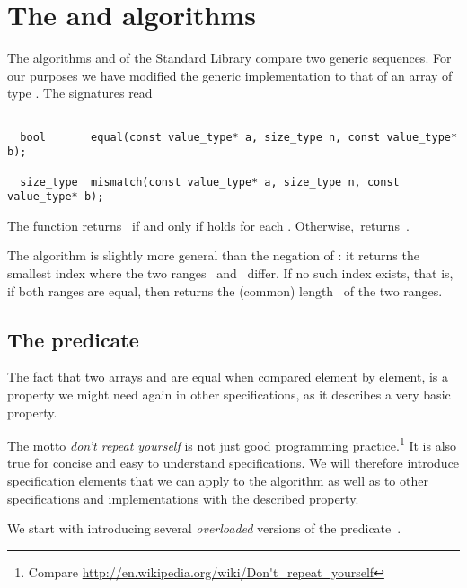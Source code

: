 
\section{The \equal and \mismatch algorithms}

The algorithms \equal \cite[\S 28.5.11]{cxx-17-draft}
and \mismatch \cite[\S 28.5.10]{cxx-17-draft}
of the \cxx Standard Library compare two generic sequences.
For our purposes we have modified the generic implementation
to that of an array of type .
The signatures read

\begin{lstlisting}[style = acsl-block]

  bool       equal(const value_type* a, size_type n, const value_type* b);

  size_type  mismatch(const value_type* a, size_type n, const value_type* b);
\end{lstlisting}

The function \equal returns~ if and only if
 holds for each .
Otherwise,~\equal returns~.

The \mismatch algorithm is slightly more general than the negation of \equal: 
it returns the smallest index where the two ranges~ and~ differ.
If no such index exists, that is, if both ranges are equal, then \mismatch
returns the (common) length~ of the two ranges.

\subsection{The \Equal predicate}

The fact that two arrays 
and  are equal when compared element by element,
is a property we might need again in other specifications, as it
describes a very basic property.

The motto \emph{don't repeat yourself} is not just good programming
practice.\footnote{
    Compare \url{http://en.wikipedia.org/wiki/Don't_repeat_yourself}
}
It is also true for concise and easy to understand specifications.
We will therefore introduce specification elements that we can apply to
the \equal algorithm as well as to other specifications and
implementations with the described property.

We start with introducing several \emph{overloaded} versions
of the predicate~.


